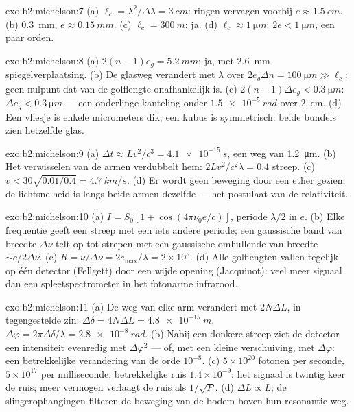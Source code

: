 \begin{solution}{exo:b2:michelson:7}
(a) $\ell_c = \lambda^2/\Delta\lambda = \qty{3}{cm}$: ringen vervagen
voorbij $e \approx \qty{1.5}{cm}$. (b)
\qty{0.3}{mm}, $e \approx \qty{0.15}{mm}$. (c) $\ell_c = \qty{300}{m}$: ja.
(d) $\ell_c \approx \qty{1}{\micro m}$:
$2e < \qty{1}{\micro m}$, een paar orden.
\end{solution}

\begin{solution}{exo:b2:michelson:8}
(a) $2(n - 1)e_g = \qty{5.2}{mm}$; ja, met \qty{2.6}{mm} spiegelverplaatsing. (b) De
glasweg verandert met $\lambda$ over
$2e_g\Delta n = \qty{100}{\micro m} \gg \ell_c$: geen
nulpunt dat van de golflengte onafhankelijk is. (c)
$2(n - 1)\Delta e_g < \qty{0.3}{\micro m}$:
$\Delta e_g <
\qty{0.3}{\micro m}$ --- een onderlinge kanteling onder
$\qty{1.5e-5}{rad}$ over \qty{2}{cm}. (d) Een
vliesje is enkele micrometers dik; een kubus is symmetrisch: beide bundels zien
hetzelfde glas.
\end{solution}

\begin{solution}{exo:b2:michelson:9}
(a) $\Delta t \approx Lv^2/c^3 = \qty{4.1e-15}{s}$, een weg van
\qty{1.2}{\micro m}. (b) Het verwisselen van de
armen verdubbelt hem: $2Lv^2/c^2\lambda = 0.4$ streep. (c)
$v < 30\sqrt{0.01/0.4} =
\qty{4.7}{km/s}$. (d) Er wordt geen beweging door
een ether gezien; de lichtsnelheid
is langs beide armen dezelfde --- het postulaat van de relativiteit.
\end{solution}

\begin{solution}{exo:b2:michelson:10}
(a) $I = S_0[1 + \cos(4\pi\nu_0e/c)]$, periode $\lambda/2$ in $e$. (b) Elke
frequentie
geeft een streep met een iets andere periode; een gaussische band van breedte
$\Delta\nu$ telt op tot strepen met een gaussische omhullende van breedte
$\sim c/2\Delta\nu$.
(c) $R = \nu/\Delta\nu = 2e_{\max}/\lambda = 2 \times 10^5$. (d) Alle
golflengten vallen
tegelijk op één detector (Fellgett) door een wijde opening (Jacquinot):
veel meer signaal dan een spleetspectrometer in het fotonarme
infrarood.
\end{solution}

\begin{solution}{exo:b2:michelson:11}
(a) De weg van elke arm verandert met $2N\Delta L$, in tegengestelde zin:
$\Delta\delta = 4N\Delta L
= \qty{4.8e-15}{m}$,
$\Delta\varphi = 2\pi\Delta\delta/\lambda = \qty{2.8e-8}{rad}$. (b) Nabij
een donkere
streep ziet de detector een intensiteit evenredig met $\Delta\varphi^2$ --- of,
met een kleine verschuiving, met $\Delta\varphi$: een betrekkelijke
verandering van de orde $10^{-8}$. (c)
$5 \times 10^{20}$ fotonen per seconde, $5 \times 10^{17}$ per milliseconde,
betrekkelijke
ruis $1.4 \times 10^{-9}$: het signaal is twintig keer de ruis; meer vermogen
verlaagt de ruis als $1/\sqrt P$. (d) $\Delta L \propto L$; de slingerophangingen
filteren de beweging van de bodem boven hun resonantie weg.
\end{solution}

